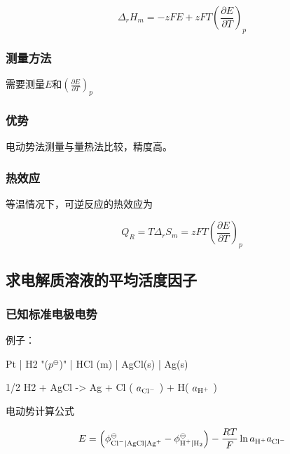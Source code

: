 \begin{equation*}
    \Delta_r H_m = -zFE + zFT \left(  \frac{\partial E}{\partial T} \right)_p 
\end{equation*}

\subsubsection{测量方法}

需要测量$E$和$\left(  \frac{\partial E}{\partial T} \right)_p $

\subsubsection{优势}

电动势法测量与量热法比较，精度高。

\subsubsection{热效应}


等温情况下，可逆反应的热效应为

\begin{equation*}
    Q_R = T \Delta_r S_m = zFT \left(  \frac{\partial E}{\partial T} \right)_p
\end{equation*}

\subsection{求电解质溶液的平均活度因子}

\subsubsection{已知标准电极电势}

例子：

\begin{reaction*}
    Pt | H2 "($p^\ominus$)" | HCl (m) | AgCl(s) | Ag(s)
\end{reaction*}

\begin{reaction*}
    1/2 H2 + AgCl -> Ag + {Cl\mch} ( $a_{\ce{Cl-}}$ ) + H\pch ( $a_{\ce{H+}}$ )
\end{reaction*}


电动势计算公式

\begin{equation*}
    E = \left( \phi^\ominus_{\ce{Cl-} | \ce{AgCl} | \ce{Ag+}}   - \phi^\ominus_{\ce{H+} | \ce{H2}} \right)  - \frac{RT}{F} \ln a_{\ce{H+}} a_{\ce{Cl-}}
\end{equation*}


